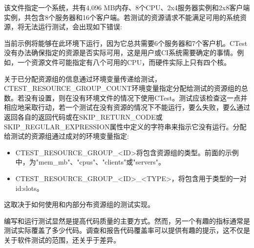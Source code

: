 该文件指定一个系统，共有4,096 MB内存、8个CPU、2x4服务器实例和2x8客户端实例，共包含8个服务器和16个客户端。若测试的资源请求不能满足可用的系统资源，将无法运行测试，会出现如下错误:


当前示例将能够在此环境下运行，因为它总共需要6个服务器和7个客户机。CTest没有办法确保指定的资源是否实际可用，这是用户或CI系统需要确定的事情。例如，一个资源文件可能指定有八个可用的CPU，而硬件实际上只有四个核。

关于已分配资源组的信息通过环境变量传递给测试，CTEST\_RESOURCE\_GROUP\_COUNT环境变量指定分配给测试的资源组的总数。若没有设置，则在没有环境文件的情况下使用CTest。测试应该检查这一点并相应地采取行动，若一个测试在没有资源的情况下不能运行，要么失败，要么通过返回各自的返回代码或在SKIP\_RETURN\_CODE或SKIP\_REGULAR\_EXPRESSION属性中定义的字符串来指示它没有运行。分配给测试的资源组通过成对的环境变量指定:

\begin{itemize}
\item 
CTEST\_RESOURCE\_GROUP\_<ID>将包含资源组的类型。前面的示例中，为"mem\_mb"、"cpus"、"clients"或"servers"。

\item 
CTEST\_RESOURCE\_GROUP\_<ID>\_<TYPE>，将包含用于类型的一对id:slots。
\end{itemize}

这取决于如何使用和内部分布资源组的测试实现。

编写和运行测试显然是提高代码质量的主要方式。然而，另一个有趣的指标通常是测试实际覆盖了多少代码。调查和报告代码覆盖率可以提供有趣的提示，这不仅是关于软件测试的范围，还关乎于差异。


















